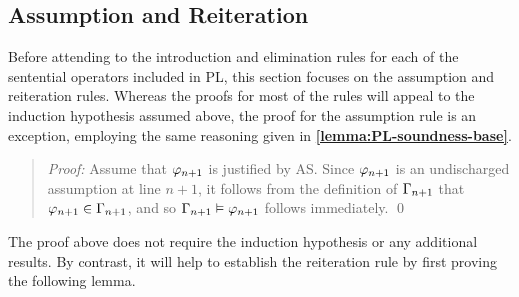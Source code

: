 \subsection{Assumption and Reiteration}%
  \label{sub:AssumptionRule}

Before attending to the introduction and elimination rules for each of the sentential operators included in PL, this section focuses on the assumption and reiteration rules.
Whereas the proofs for most of the rules will appeal to the induction hypothesis assumed above, the proof for the assumption rule is an exception, employing the same reasoning given in \textbf{\ref{lemma:PL-soundness-base}}. 


\begin{quote} 
  \textit{Proof:} Assume that $\varphi_{n+1}$ is justified by AS.
  Since $\varphi_{n+1}$ is an undischarged assumption at line $n+1$, it follows from the definition of $\Gamma_{n+1}$ that $\varphi_{n+1}\in\Gamma_{n+1}$, and so $\Gamma_{n+1} \vDash \varphi_{n+1}$ follows immediately.
  \qed
\end{quote}

The proof above does not require the induction hypothesis or any additional results.
By contrast, it will help to establish the reiteration rule by first proving the following lemma.

%
%
%


